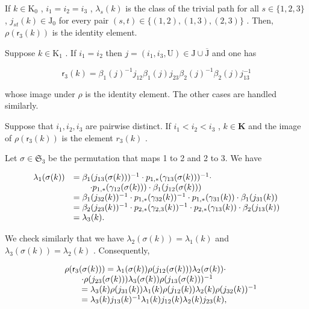 If \(k \in \mathrm{K}_0\) , \(i_1 = i_2 = i_3\) , \(\lambda_s(k)\) is the class of the trivial path for all \(s \in \{1,2,3\}\) , \(j_{st}(k) \in \mathrm{J}_0\) for every pair \((s,t) \in \{(1,2),(1,3),(2,3)\}\) . Then, \(\rho(\mathsf{r}_3(k))\) is the identity element.

Suppose \(k\in \mathrm{K}_1\) . If \(i_1 = i_2\) then \(j = (i_{1},i_{3},\mathrm{U})\in \mathrm{J}\cup \overline{\mathrm{J}}\) and one has

\[
\mathsf {r} _ {3} (k) = \beta_ {1} (j) ^ {- 1} j _ {1 2} \beta_ {1} (j) j _ {2 3} \beta_ {2} (j) ^ {- 1} \beta_ {2} (j) j _ {1 3} ^ {- 1}
\]

whose image under \(\rho\) is the identity element. The other cases are handled similarly.

Suppose that \(i_{1}, i_{2}, i_{3}\) are pairwise distinct. If \(i_{1} < i_{2} < i_{3}\) , \(k \in \mathbf{K}\) and the image of \(\rho(\mathsf{r}_{3}(k))\) is the element \(r_{3}(k)\) .

Let \(\sigma \in \mathfrak{S}_3\) be the permutation that maps 1 to 2 and 2 to 3. We have

\[
\begin{array}{r l} \lambda_ {1} (\sigma (k)) & = \beta_ {1} (j _ {1 3} (\sigma (k))) ^ {- 1} \cdot p _ {1, *} (\gamma_ {1 3} (\sigma (k))) ^ {- 1} \cdot \\ & \qquad \cdot p _ {1, *} (\gamma_ {1 2} (\sigma (k))) \cdot \beta_ {1} (j _ {1 2} (\sigma (k))) \\ & = \beta_ {1} (j _ {3 2} (k)) ^ {- 1} \cdot p _ {1, *} (\gamma_ {3 2} (k)) ^ {- 1} \cdot p _ {1, *} (\gamma_ {3 1} (k)) \cdot \beta_ {1} (j _ {3 1} (k)) \\ & = \beta_ {2} (j _ {2 3} (k)) ^ {- 1} \cdot p _ {2, *} (\gamma_ {2, 3} (k)) ^ {- 1} \cdot p _ {2, *} (\gamma_ {1 3} (k)) \cdot \beta_ {2} (j _ {1 3} (k)) \\ & = \lambda_ {3} (k). \end{array}
\]

We check similarly that we have \(\lambda_2(\sigma(k)) = \lambda_1(k)\) and \(\lambda_3(\sigma(k)) = \lambda_2(k)\) . Consequently,

\[
\begin{array}{r l} & {\rho (\mathsf {r} _ {3} (\sigma (k))) = \lambda_ {1} (\sigma (k)) \rho (j _ {1 2} (\sigma (k))) \lambda_ {2} (\sigma (k)) \cdot} \\ & {\qquad \cdot \rho (j _ {2 3} (\sigma (k))) \lambda_ {3} (\sigma (k)) \rho (j _ {1 3} (\sigma (k))) ^ {- 1}} \\ & {\qquad = \lambda_ {3} (k) \rho (j _ {3 1} (k)) \lambda_ {1} (k) \rho (j _ {1 2} (k)) \lambda_ {2} (k) \rho (j _ {3 2} (k)) ^ {- 1}} \\ & {\qquad = \lambda_ {3} (k) j _ {1 3} (k) ^ {- 1} \lambda_ {1} (k) j _ {1 2} (k) \lambda_ {2} (k) j _ {2 3} (k),} \end{array}
\]

